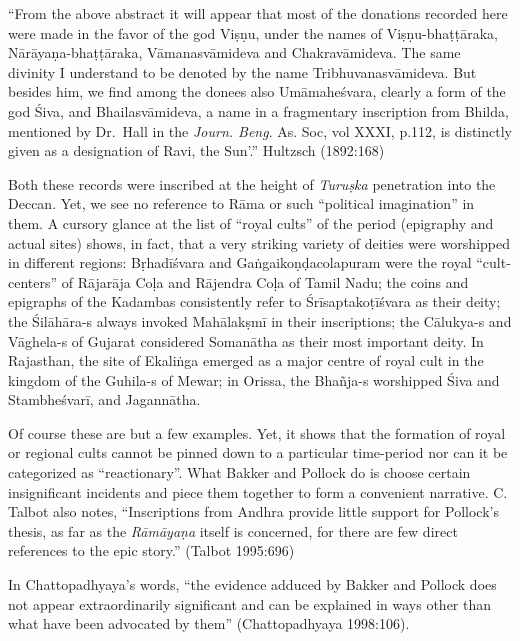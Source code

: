 \begin{myquote}
“From the above abstract it will appear that most of the donations recorded here were made in the favor of the god Viṣṇu, under the names of Viṣṇu-bhaṭṭāraka, Nārāyaṇa-bhaṭṭāraka, Vāmanasvāmideva and Chakravāmideva. The same divinity I understand to be denoted by the name Tribhuvanasvāmideva. But besides him, we find among the donees also Umāmaheśvara, clearly a form of the god Śiva, and Bhailasvāmideva, a name in a fragmentary inscription from Bhilda, mentioned by Dr.~Hall in the {\sl Journ. Beng}. As. Soc, vol XXXI, p.112, is distinctly given as a designation of Ravi, the Sun’.”
\hfill Hultzsch  (1892:168)
\end{myquote}

Both these records were inscribed at the height of {\sl Turuṣka} penetration into the Deccan. Yet, we see no reference to Rāma or such “political imagination” in them. A cursory glance at the list of “royal cults” of the period (epigraphy and actual sites) shows, in fact, that a very striking variety of deities were worshipped in different regions: Bṛhadīśvara and Gaṅgaikoṇḍacolapuram were the royal “cult-centers” of Rājarāja Coḷa and Rājendra Coḷa of Tamil Nadu; the coins and epigraphs of the Kadambas consistently refer to Śrīsaptakoṭīśvara as their deity; the Śilāhāra-s always invoked Mahālakṣmī in their inscriptions; the Cālukya-s and Vāghela-s of Gujarat considered Somanātha as their most important deity. In Rajasthan, the site of Ekaliṅga emerged as a major centre of royal cult in the kingdom of the Guhila-s of Mewar; in Orissa, the Bhañja-s worshipped Śiva and Stambheśvarī, and Jagannātha.

Of course these are but a few examples. Yet, it shows that the formation of royal or regional cults cannot be pinned down to a particular time-period nor can it be categorized as “reactionary”.  What Bakker and Pollock do is choose certain insignificant incidents and piece them together to form a convenient narrative. C. Talbot also notes, “Inscriptions from Andhra provide little support for Pollock’s thesis, as far as the {\sl Rāmāyaṇa} itself is concerned, for there are few direct references to the epic story.” (Talbot 1995:696) 

In Chattopadhyaya’s words, “the evidence adduced by Bakker and Pollock does not appear extraordinarily significant and can be explained in ways other than what have been advocated by them” (Chattopadhyaya 1998:106). 

